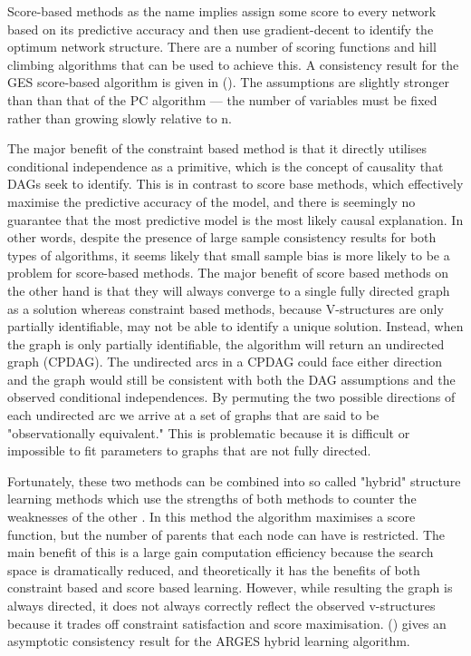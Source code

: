 \documentclass{article}
\begin{document}
Score-based methods as the name implies assign some score to every network based on its predictive accuracy and then use gradient-decent to identify the optimum network structure. There are a number of scoring functions and hill climbing algorithms that can be used to achieve this. A consistency result for the GES score-based algorithm is given in \citeauthor{chickering2002optimal} (\citeyear{chickering2002optimal}). The assumptions are slightly stronger than than that of the PC algorithm --- the number of variables must be fixed rather than growing slowly relative to n.

The major benefit of the constraint based method is that it directly utilises conditional independence as a primitive, which is the concept of causality that DAGs seek to identify. This is in contrast to score base methods, which effectively maximise the predictive accuracy of the model, and there is seemingly no guarantee that the most predictive model is the most likely causal explanation. In other words, despite the presence of large sample consistency results for both types of algorithms, it seems likely that small sample bias is more likely to be a problem for score-based methods. The major benefit of score based methods on the other hand is that they will always converge to a single fully directed graph as a solution whereas constraint based methods, because V-structures are only partially identifiable, may not be able to identify a unique solution. Instead, when the graph is only partially identifiable, the algorithm will return an undirected graph (CPDAG). The undirected arcs in a CPDAG could face either direction and the graph would still be consistent with both the DAG assumptions and the observed conditional independences. By permuting the two possible directions of each undirected arc we arrive at a set of graphs that are said to be "observationally equivalent." This is problematic because it is difficult or impossible to fit parameters to graphs that are not fully directed.  

Fortunately, these two methods can be combined into so called "hybrid" structure learning methods which use the strengths of both methods to counter the weaknesses of the other \parencite{scutari2014multiple} \parencite{friedman2013learning}. In this method the algorithm maximises a score function, but the number of parents that each node can have is restricted. The main benefit of this is a large gain computation efficiency because the search space is dramatically reduced, and theoretically it has the benefits of both constraint based and score based learning. However, while resulting the graph is always directed, it does not always correctly reflect the observed v-structures because it trades off constraint satisfaction and score maximisation. \citeauthor{nandy2018high} (\citeyear{nandy2018high}) gives an asymptotic consistency result for the ARGES hybrid learning algorithm.
\end{document}
